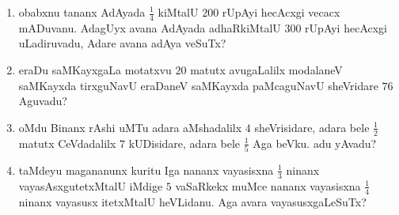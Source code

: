 \begin{enumerate}[\rm(1)]
\item obabxnu tananx AdAyada $\tfrac{1}{4}$ kiMtalU $200$ rUpAyi hecAcxgi vecacx mADuvanu. AdagUyx avana AdAyada adhaRkiMtalU $300$ rUpAyi hecAcxgi uLadiruvadu, Adare avana adAya veSuTx?

\item eraDu saMKayxgaLa motatxvu $20$ matutx avugaLalilx modalaneV saMKayxda tirxguNavU eraDaneV saMKayxda paMcaguNavU sheVridare $76$ Aguvadu?

\item oMdu Binanx rAshi uMTu adara aMshadalilx $4$ sheVrisidare, adara bele $\tfrac{1}{2}$ matutx CeVdadalilx $7$ kUDisidare, adara bele $\tfrac{1}{5}$ Aga beVku. adu yAvadu?

\item taMdeyu magananunx kuritu Iga nananx vayasisxna $\tfrac{1}{3}$ ninanx vayasAsxgutetxMtalU iMdige $5$ vaSaRkekx muMce nananx vayasisxna $\tfrac{1}{4}$ ninanx vayasusx itetxMtalU heVLidanu. Aga avara vayasusxgaLeSuTx?
\end{enumerate}



